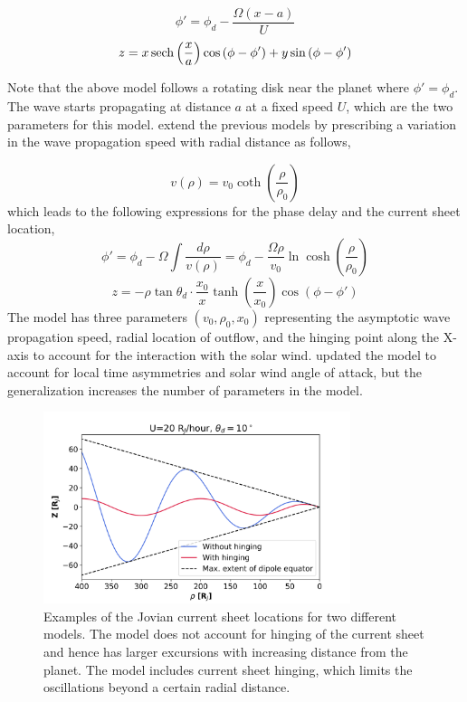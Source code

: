 \begin{equation}
    \phi' = \phi_d - \frac{\Omega \left(x - a\right)}{U}
\end{equation}
\begin{equation}
    z = x \operatorname{sech} \left( \frac{x}{a} \right) \cos\left(\phi - \phi' \right) + y \sin\left(\phi - \phi' \right)  
\end{equation}

Note that the above model follows a rotating disk near the planet where $\phi'=\phi_d$. The wave starts propagating at distance $a$ at a fixed speed $U$, which are the two parameters for this model.  extend the previous models by prescribing a variation in the wave propagation speed with radial distance as follows,

\begin{equation}
    v(\rho) = v_0 \coth \left(\frac{\rho}{\rho_0} \right)
\end{equation}
which leads to the following expressions for the phase delay and the current sheet location,
\begin{equation}
    \phi' = \phi_d - \Omega \int \frac{d\rho}{v(\rho)} = \phi_d - \frac{\Omega \rho}{v_0} \ln \cosh \left( \frac{\rho}{\rho_0} \right) 
\end{equation}
\begin{equation}
    z = -\rho \tan\theta_d \cdot \frac{x_0}{x} \tanh\left(\frac{x}{x_0} \right) \cos\left( \phi - \phi'\right) 
    \label{eqn:khurana1992}
\end{equation}
The  model has three parameters $(v_0, \rho_0, x_0)$ representing the asymptotic wave propagation speed, radial location of outflow, and the hinging point along the X-axis to account for the interaction with the solar wind.  updated the model to account for local time asymmetries and solar wind angle of attack, but the generalization increases the number of parameters in the model. 

\begin{figure}
    \centering
    \includegraphics[width=0.8\textwidth]{images6/example-hinging.png}
    \caption{Examples of the Jovian current sheet locations for two different models. The \protect{} model does not account for hinging of the current sheet and hence has larger excursions with increasing distance from the planet. The \protect{} model includes current sheet hinging, which limits the oscillations beyond a certain radial distance.}
    \label{fig:example-hinging}
\end{figure}

